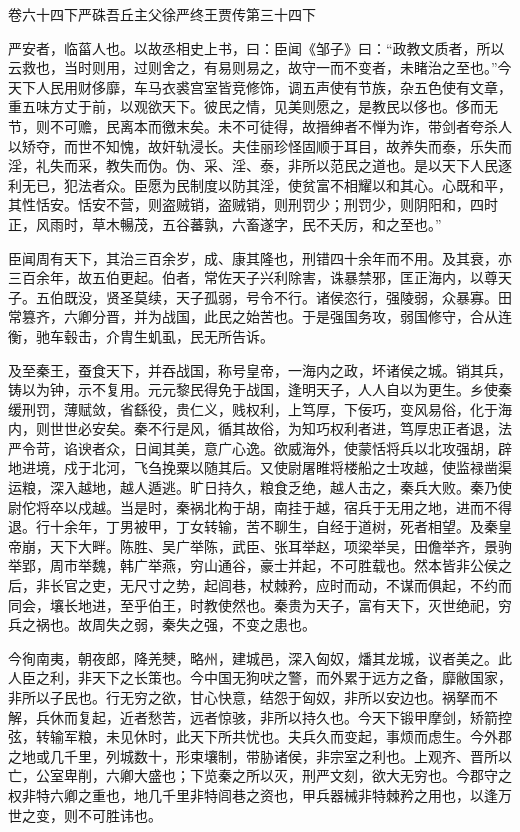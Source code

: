 \documentclass[12pt,UTF8]{ctexbook}
\begin{document}
卷六十四下严硃吾丘主父徐严终王贾传第三十四下



严安者，临菑人也。以故丞相史上书，曰：臣闻《邹子》曰：“政教文质者，所以云救也，当时则用，过则舍之，有易则易之，故守一而不变者，未睹治之至也。”今天下人民用财侈靡，车马衣裘宫室皆竞修饰，调五声使有节族，杂五色使有文章，重五味方丈于前，以观欲天下。彼民之情，见美则愿之，是教民以侈也。侈而无节，则不可赡，民离本而徼末矣。未不可徒得，故搢绅者不惮为诈，带剑者夸杀人以矫夺，而世不知愧，故奸轨浸长。夫佳丽珍怪固顺于耳目，故养失而泰，乐失而淫，礼失而采，教失而伪。伪、采、淫、泰，非所以范民之道也。是以天下人民逐利无已，犯法者众。臣愿为民制度以防其淫，使贫富不相耀以和其心。心既和平，其性恬安。恬安不营，则盗贼销，盗贼销，则刑罚少；刑罚少，则阴阳和，四时正，风雨时，草木暢茂，五谷蕃孰，六畜遂字，民不夭厉，和之至也。”



臣闻周有天下，其治三百余岁，成、康其隆也，刑错四十余年而不用。及其衰，亦三百余年，故五伯更起。伯者，常佐天子兴利除害，诛暴禁邪，匡正海内，以尊天子。五伯既没，贤圣莫续，天子孤弱，号令不行。诸侯恣行，强陵弱，众暴寡。田常篡齐，六卿分晋，并为战国，此民之始苦也。于是强国务攻，弱国修守，合从连衡，驰车毂击，介胄生虮虱，民无所告诉。



及至秦王，蚕食天下，并吞战国，称号皇帝，一海内之政，坏诸侯之城。销其兵，铸以为钟，示不复用。元元黎民得免于战国，逢明天子，人人自以为更生。乡使秦缓刑罚，薄赋敛，省繇役，贵仁义，贱权利，上笃厚，下佞巧，变风易俗，化于海内，则世世必安矣。秦不行是风，循其故俗，为知巧权利者进，笃厚忠正者退，法严令苛，谄谀者众，日闻其美，意广心逸。欲威海外，使蒙恬将兵以北攻强胡，辟地进境，戍于北河，飞刍挽粟以随其后。又使尉屠睢将楼船之士攻越，使监禄凿渠运粮，深入越地，越人遁逃。旷日持久，粮食乏绝，越人击之，秦兵大败。秦乃使尉佗将卒以戍越。当是时，秦祸北构于胡，南挂于越，宿兵于无用之地，进而不得退。行十余年，丁男被甲，丁女转输，苦不聊生，自经于道树，死者相望。及秦皇帝崩，天下大畔。陈胜、吴广举陈，武臣、张耳举赵，项梁举吴，田儋举齐，景驹举郢，周市举魏，韩广举燕，穷山通谷，豪士并起，不可胜载也。然本皆非公侯之后，非长官之吏，无尺寸之势，起闾巷，杖棘矜，应时而动，不谋而俱起，不约而同会，壤长地进，至乎伯王，时教使然也。秦贵为天子，富有天下，灭世绝祀，穷兵之祸也。故周失之弱，秦失之强，不变之患也。



今徇南夷，朝夜郎，降羌僰，略州，建城邑，深入匈奴，燔其龙城，议者美之。此人臣之利，非天下之长策也。今中国无狗吠之警，而外累于远方之备，靡敝国家，非所以子民也。行无穷之欲，甘心快意，结怨于匈奴，非所以安边也。祸拏而不解，兵休而复起，近者愁苦，远者惊骇，非所以持久也。今天下锻甲摩剑，矫箭控弦，转输军粮，未见休时，此天下所共忧也。夫兵久而变起，事烦而虑生。今外郡之地或几千里，列城数十，形束壤制，带胁诸侯，非宗室之利也。上观齐、晋所以亡，公室卑削，六卿大盛也；下览秦之所以灭，刑严文刻，欲大无穷也。今郡守之权非特六卿之重也，地几千里非特闾巷之资也，甲兵器械非特棘矜之用也，以逢万世之变，则不可胜讳也。
\end{document}
